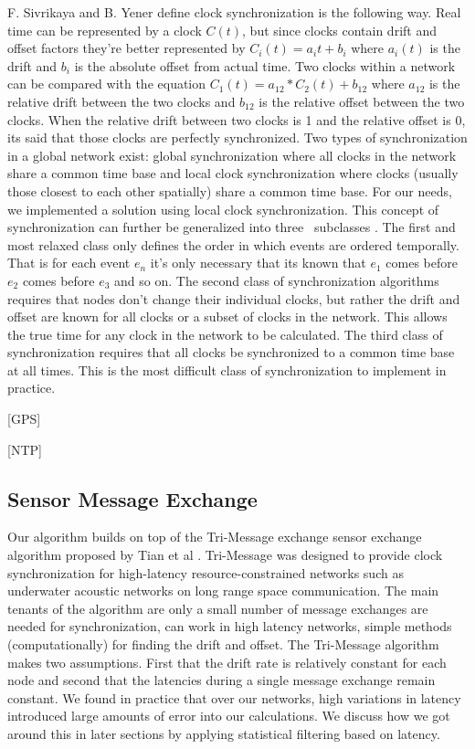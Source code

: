 F. Sivrikaya and B. Yener \cite{sivrikaya_time_2004} define clock synchronization is the following way. Real time can be represented by a clock $ C(t)$, but since clocks contain drift and offset factors they're better represented by $C_i(t) = a_it + b_i$ where $a_i(t)$ is the drift and $b_i$ is the absolute offset from actual time. Two clocks within a network can be compared with the equation $ C_1(t) = a_{12} * C_2(t) + b_{12}$ where $a_{12}$ is the relative drift between the two clocks and $b_{12}$ is the relative offset between the two clocks. When the relative drift between two clocks is 1 and the relative offset is 0, its said that those clocks are perfectly synchronized. Two types of synchronization in a global network exist: global synchronization where all clocks in the network share a common time base and local clock synchronization where clocks (usually those closest to each other spatially) share a common time base. For our needs, we implemented a solution using local clock synchronization. This concept of synchronization can further be generalized into three \ subclasses \cite{ganeriwal_timing-sync_2003}. The first and most relaxed class only defines the order in which events are ordered temporally. That is for each event $e_n$ it's only necessary that its known that $e_1$ comes before $e_2$ comes before $e_3$ and so on. The second class of synchronization algorithms requires that nodes don't change their individual clocks, but rather the drift and offset are known for all clocks or a subset of clocks in the network. This allows the true time for any clock in the network to be calculated. The third class of synchronization requires that all clocks be synchronized to a common time base at all times. This is the most difficult class of synchronization to implement in practice.

[GPS]

[NTP]

\subsection{Sensor Message Exchange}
Our algorithm builds on top of the Tri-Message exchange sensor exchange algorithm proposed by Tian et al \cite{tian_tri-message:_2009}. Tri-Message was designed to provide clock synchronization for high-latency resource-constrained networks such as underwater acoustic networks on long range space communication. The main tenants of the algorithm are only a small number of message exchanges are needed for synchronization, can work in high latency networks, simple methods (computationally) for finding the drift and offset. The Tri-Message algorithm makes two assumptions. First that the drift rate is relatively constant for each node and second that the latencies during a single message exchange remain constant. We found in practice that over our networks, high variations in latency introduced large amounts of error into our calculations. We discuss how we got around this in later sections by applying statistical filtering based on latency.

